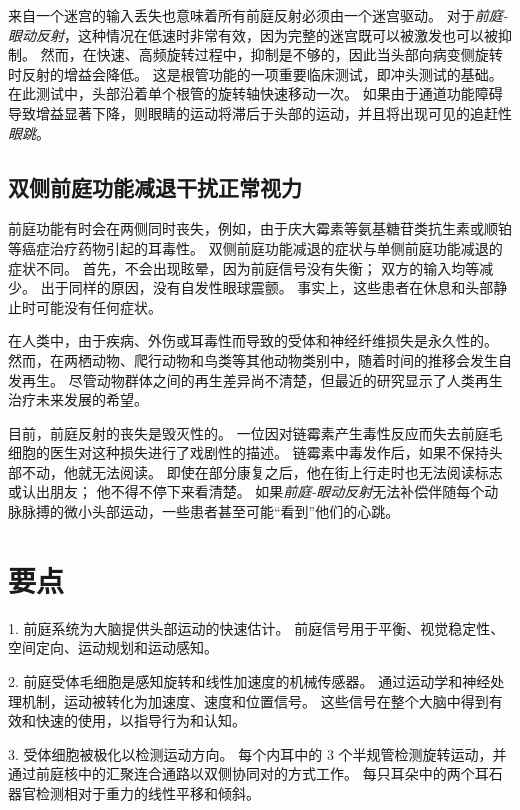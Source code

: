 来自一个迷宫的输入丢失也意味着所有前庭反射必须由一个迷宫驱动。
对于\textit{前庭-眼动反射}，这种情况在低速时非常有效，因为完整的迷宫既可以被激发也可以被抑制。
然而，在快速、高频旋转过程中，抑制是不够的，因此当头部向病变侧旋转时反射的增益会降低。
这是根管功能的一项重要临床测试，即冲头测试的基础。
在此测试中，头部沿着单个根管的旋转轴快速移动一次。
如果由于通道功能障碍导致增益显著下降，则眼睛的运动将滞后于头部的运动，并且将出现可见的追赶性\textit{眼跳}。



\subsection{双侧前庭功能减退干扰正常视力}

前庭功能有时会在两侧同时丧失，例如，由于庆大霉素等氨基糖苷类抗生素或顺铂等癌症治疗药物引起的耳毒性。
双侧前庭功能减退的症状与单侧前庭功能减退的症状不同。
首先，不会出现眩晕，因为前庭信号没有失衡；
双方的输入均等减少。
出于同样的原因，没有自发性眼球震颤。
事实上，这些患者在休息和头部静止时可能没有任何症状。


在人类中，由于疾病、外伤或耳毒性而导致的受体和神经纤维损失是永久性的。
然而，在两栖动物、爬行动物和鸟类等其他动物类别中，随着时间的推移会发生自发再生。
尽管动物群体之间的再生差异尚不清楚，但最近的研究显示了人类再生治疗未来发展的希望。


目前，前庭反射的丧失是毁灭性的。
一位因对链霉素产生毒性反应而失去前庭毛细胞的医生对这种损失进行了戏剧性的描述。
链霉素中毒发作后，如果不保持头部不动，他就无法阅读。
即使在部分康复之后，他在街上行走时也无法阅读标志或认出朋友；
他不得不停下来看清楚。
如果\textit{前庭-眼动反射}无法补偿伴随每个动脉脉搏的微小头部运动，一些患者甚至可能“看到”他们的心跳。



\section{要点}

1. 前庭系统为大脑提供头部运动的快速估计。
前庭信号用于平衡、视觉稳定性、空间定向、运动规划和运动感知。


2. 前庭受体毛细胞是感知旋转和线性加速度的机械传感器。
通过运动学和神经处理机制，运动被转化为加速度、速度和位置信号。
这些信号在整个大脑中得到有效和快速的使用，以指导行为和认知。


3. 受体细胞被极化以检测运动方向。
每个内耳中的 3 个半规管检测旋转运动，并通过前庭核中的汇聚连合通路以双侧协同对的方式工作。
每只耳朵中的两个耳石器官检测相对于重力的线性平移和倾斜。


